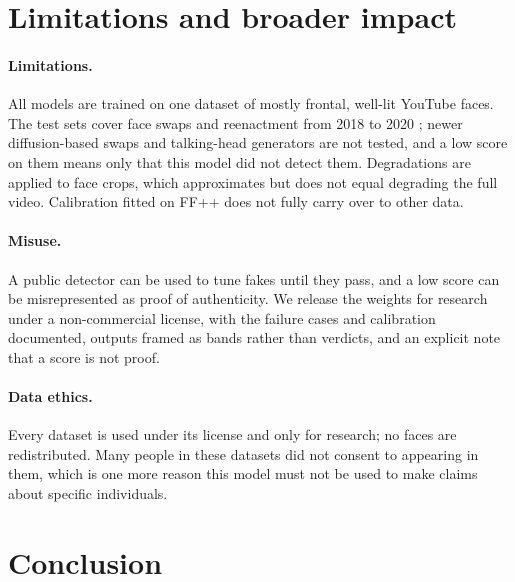 \section{Limitations and broader impact}

\paragraph{Limitations.} All models are trained on one dataset of mostly frontal, well-lit
YouTube faces. The test sets cover face swaps and reenactment from 2018 to 2020 ; newer diffusion-based swaps and talking-head generators are not tested, and a low score
on them means only that this model did not detect them. Degradations are applied to face crops,
which approximates but does not equal degrading the full video. Calibration fitted on FF++ does
not fully carry over to other data. 

\paragraph{Misuse.} A public detector can be used to tune fakes until they pass, and a low score
can be misrepresented as proof of authenticity. We release the weights for research under a
non-commercial license, with the failure cases and calibration documented, outputs framed as
bands rather than verdicts, and an explicit note that a score is not proof.

\paragraph{Data ethics.} Every dataset is used under its license and only for research; no faces
are redistributed. Many people in these datasets did not consent to appearing in them, which is
one more reason this model must not be used to make claims about specific individuals.

\section{Conclusion}
